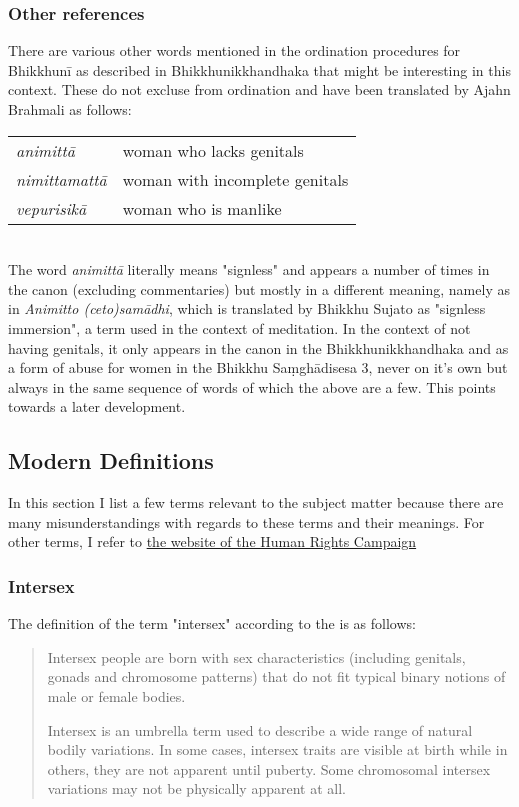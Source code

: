 \subsubsection{Other references}
There are various other words mentioned in the ordination procedures for Bhikkhunī as described in Bhikkhunikkhandhaka that might be interesting in this context. These do not excluse from ordination and have been translated by Ajahn Brahmali as follows: \\

\begin{tabular}{ l l }
 {\em animittā } & woman who lacks genitals \\
 {\em nimittamattā } & woman with incomplete genitals \\ 
 {\em vepurisikā } & woman who is manlike \\
\end{tabular} \\

The word {\em animittā} literally means "signless" and appears a number of times in the canon (excluding commentaries) but mostly in a different meaning, namely as in {\em Animitto (ceto)samādhi}, which is translated by Bhikkhu Sujato as "signless immersion", a term used in the context of meditation. In the context of not having genitals, it only appears in the canon in the Bhikkhunikkhandhaka and as a form of abuse for women in the Bhikkhu Saṃ­ghā­di­sesa­ 3, never on it's own but always in the same sequence of words of which the above are a few. This points towards a later development.


\subsection{Modern Definitions}
In this section I list a few terms relevant to the subject matter because there are many misunderstandings with regards to these terms and their meanings. For other terms, I refer to \href{https://www.hrc.org/resources/glossary-of-terms}{the website of the Human Rights Campaign}

\subsubsection{Intersex}
The definition of the term "intersex" according to the \cite{un2015} is as follows:

\begin{quote}
Intersex people are born with sex characteristics (including genitals, gonads and chromosome patterns) that do not fit typical binary notions of male or female bodies.

Intersex is an umbrella term used to describe a wide range of natural bodily variations. In some cases, intersex traits are visible at birth while in others, they are not apparent until puberty. Some chromosomal intersex variations may not be physically apparent at all.
\end{quote}

